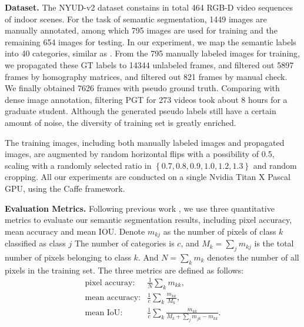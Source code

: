 \noindent\textbf{Dataset.}  
The NYUD-v2 dataset constains in total 464 RGB-D video sequences of indoor scenes. 
%
For the task of semantic segmentation, 1449 images are manually annotated, among which 795 images are used for training and the remaining 654 images for testing.
%
In our experiment, we map the semantic labels into 40 categories, similar as \cite{Gupta2014}.
%
From the 795 manually labeled images for training, we propagated these GT labels to 14344 unlabeled frames, and filtered out 5897 frames by homography matrices, and filtered out 821 frames by manual check. 
We finally obtained 7626 frames with pseudo ground truth. 
%
Comparing with dense image annotation, filtering PGT for 273 videos took about 8 hours for a graduate student.
%
Although the generated pseudo labels still have a certain amount of noise, the diversity of training set is greatly enriched. 



The training images, including both manually labeled images and propagated images, are augmented by random horizontal flips with a possibility of 0.5, scaling with a randomly selected ratio in $\left\{0.7,0.8,0.9,1.0,1.2,1.3\right\}$ and random cropping. 
%
All our experiments are conducted on a single Nvidia Titan X Pascal GPU, using the Caffe framework.

\noindent\textbf{Evaluation Metrics.}  
Following previous work
\cite{Eigen2015,Gupta2014,Kendall2015,Lin2016,Lin2017,Li2016,Cheng2017,Park2017,Xu2018,Zhang2018,Jiao2018}, we use three quantitative metrics to evaluate our semantic segmentation results, including pixel accuracy, mean accuracy and mean IOU. 
Denote $m_{kj}$ as the number of pixels of class ${k}$ classified as class ${j}$
The number of categories is $c$, and $M_{k} = \sum_{j}m_{kj}$ is the total number of pixels belonging to class $k$. 
%
And $N = \sum_{k}m_{k}$ denotes the number of all pixels in the training set.
%
The three metrics are defined as follows:
\begin{equation}\label{eq:metric}
\begin{array}{rl}
\text{pixel accuray}: &  \frac{1}{N}\sum_{k}m_{kk}, \\
\text{mean accuracy}: &\frac{1}{c}\sum_{k}\frac{m_{kk}}{M_{k}}, \\
\text{mean IoU}: &\frac{1}{c}\sum_{k}\frac{m_{kk}}{ M_{k}+\sum_{j}m_{jk}-m_{kk}}.
\end{array}
\end{equation}





